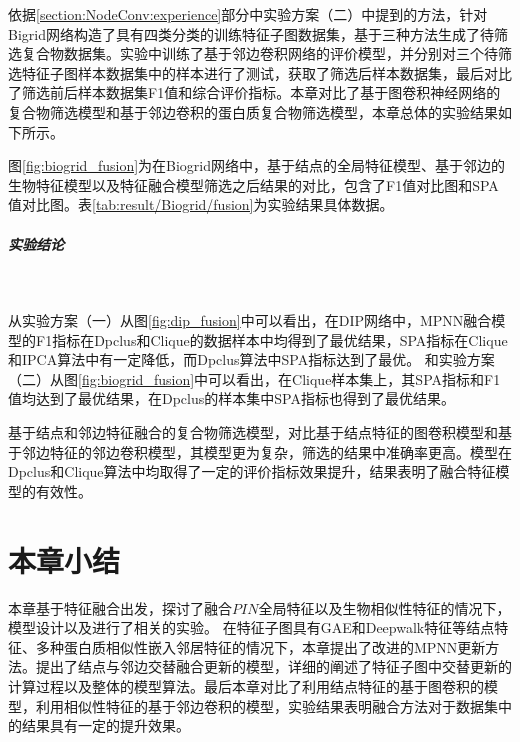 依据\ref{section:NodeConv:experience}部分中实验方案（二）中提到的方法，针对Bigrid网络构造了具有四类分类的训练特征子图数据集，基于三种方法生成了待筛选复合物数据集。实验中训练了基于邻边卷积网络的评价模型，并分别对三个待筛选特征子图样本数据集中的样本进行了测试，获取了筛选后样本数据集，最后对比了筛选前后样本数据集F1值和综合评价指标。本章对比了基于图卷积神经网络的复合物筛选模型和基于邻边卷积的蛋白质复合物筛选模型，本章总体的实验结果如下所示。

图\ref{fig:biogrid_fusion}为在Biogrid网络中，基于结点的全局特征模型、基于邻边的生物特征模型以及特征融合模型筛选之后结果的对比，包含了F1值对比图和SPA值对比图。表\ref{tab:result/Biogrid/fusion}为实验结果具体数据。

\subparagraph*{实验结论} ~

从实验方案（一）从图\ref{fig:dip_fusion}中可以看出，在DIP网络中，MPNN融合模型的F1指标在Dpclus和Clique的数据样本中均得到了最优结果，SPA指标在Clique和IPCA算法中有一定降低，而Dpclus算法中SPA指标达到了最优。
和实验方案（二）从图\ref{fig:biogrid_fusion}中可以看出，在Clique样本集上，其SPA指标和F1值均达到了最优结果，在Dpclus的样本集中SPA指标也得到了最优结果。

基于结点和邻边特征融合的复合物筛选模型，对比基于结点特征的图卷积模型和基于邻边特征的邻边卷积模型，其模型更为复杂，筛选的结果中准确率更高。模型在Dpclus和Clique算法中均取得了一定的评价指标效果提升，结果表明了融合特征模型的有效性。


\section{本章小结}
\label{section:MPNN:summary}

本章基于特征融合出发，探讨了融合$PIN$全局特征以及生物相似性特征的情况下，模型设计以及进行了相关的实验。
在特征子图具有GAE和Deepwalk特征等结点特征、多种蛋白质相似性嵌入邻居特征的情况下，本章提出了改进的MPNN更新方法。提出了结点与邻边交替融合更新的模型，详细的阐述了特征子图中交替更新的计算过程以及整体的模型算法。最后本章对比了利用结点特征的基于图卷积的模型，利用相似性特征的基于邻边卷积的模型，实验结果表明融合方法对于数据集中的结果具有一定的提升效果。